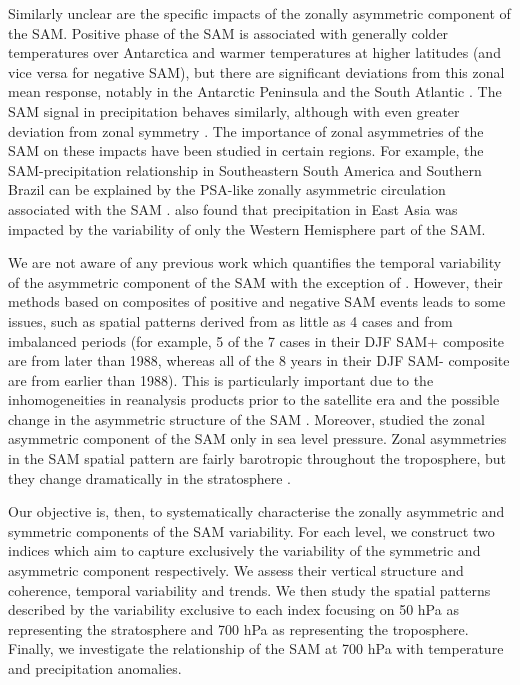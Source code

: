 \documentclass[smallextended]{svjour3}       %
\begin{document}
Similarly unclear are the specific impacts of the zonally asymmetric component of the SAM. Positive phase of the SAM is associated with generally colder temperatures over Antarctica and warmer temperatures at higher latitudes \citep{jones2019} (and vice versa for negative SAM), but there are significant deviations from this zonal mean response, notably in the Antarctic Peninsula and the South Atlantic \citep{fogt2012}. The SAM signal in precipitation behaves similarly, although with even greater deviation from zonal symmetry \citep{lim2016}. The importance of zonal asymmetries of the SAM on these impacts have been studied in certain regions. For example, the SAM-precipitation relationship in Southeastern South America and Southern Brazil can be explained by the PSA-like zonally asymmetric circulation associated with the SAM \citep{silvestri2009, rosso2018}. \citet{fan2007} also found that precipitation in East Asia was impacted by the variability of only the Western Hemisphere part of the SAM.

We are not aware of any previous work which quantifies the temporal variability of the asymmetric component of the SAM with the exception of \citet{fogt2012}. However, their methods based on composites of positive and negative SAM events leads to some issues, such as spatial patterns derived from as little as 4 cases and from imbalanced periods (for example, 5 of the 7 cases in their DJF SAM+ composite are from later than 1988, whereas all of the 8 years in their DJF SAM- composite are from earlier than 1988). This is particularly important due to the inhomogeneities in reanalysis products prior to the satellite era and the possible change in the asymmetric structure of the SAM \citep{silvestri2009}. Moreover, \citet{fogt2012} studied the zonal asymmetric component of the SAM only in sea level pressure. Zonal asymmetries in the SAM spatial pattern are fairly barotropic throughout the troposphere, but they change dramatically in the stratosphere \citep{baldwin2009}.

Our objective is, then, to systematically characterise the zonally asymmetric and symmetric components of the SAM variability. For each level, we construct two indices which aim to capture exclusively the variability of the symmetric and asymmetric component respectively. We assess their vertical structure and coherence, temporal variability and trends. We then study the spatial patterns described by the variability exclusive to each index focusing on 50 hPa as representing the stratosphere and 700 hPa as representing the troposphere. Finally, we investigate the relationship of the SAM at 700 hPa with temperature and precipitation anomalies.
\end{document}
